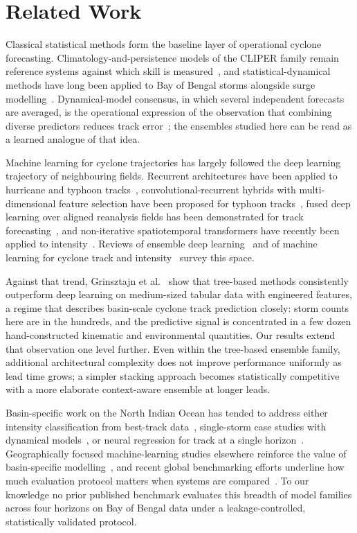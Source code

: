 \documentclass[10pt,twocolumn,a4paper]{article}
\newcommand{\bob}{Bay of Bengal}
\begin{document}
\section{Related Work}
\label{sec:related}
Classical statistical methods form the baseline layer of operational cyclone
forecasting. Climatology-and-persistence models of the CLIPER family remain
reference systems against which skill is
measured~\cite{neumann1972alternative,aberson1998five}, and statistical-dynamical
methods have long been applied to \bob{} storms alongside surge
modelling~\cite{dube2009storm}. Dynamical-model consensus, in which several
independent forecasts are averaged, is the operational expression of the
observation that combining diverse predictors reduces track
error~\cite{goerss2000tropical,goerss2004tropical}; the ensembles studied here
can be read as a learned analogue of that idea.

Machine learning for cyclone trajectories has largely followed the deep learning
trajectory of neighbouring fields. Recurrent architectures have been applied to
hurricane and typhoon tracks~\cite{alemany2019predicting,rahman2025tropical},
convolutional-recurrent hybrids with multi-dimensional feature selection have
been proposed for typhoon tracks~\cite{lian2020novel}, fused deep learning over
aligned reanalysis fields has been demonstrated for track
forecasting~\cite{giffard2020tropical}, and non-iterative spatiotemporal
transformers have recently been applied to intensity~\cite{qu2025accurate}.
Reviews of ensemble deep learning~\cite{ganaie2022ensemble} and of machine
learning for cyclone track and intensity~\cite{kumar2024machine} survey this
space.

Against that trend, Grinsztajn et al.~\cite{grinsztajn2022tree} show that
tree-based methods consistently outperform deep learning on medium-sized tabular
data with engineered features, a regime that describes basin-scale cyclone track
prediction closely: storm counts here are in the hundreds, and the predictive
signal is concentrated in a few dozen hand-constructed kinematic and
environmental quantities. Our results extend that observation one level further.
Even within the tree-based ensemble family, additional architectural complexity
does not improve performance uniformly as lead time grows; a simpler stacking
approach becomes statistically competitive with a more elaborate context-aware
ensemble at longer leads.

Basin-specific work on the North Indian Ocean has tended to address either
intensity classification from best-track
data~\cite{kar2021tropical}, single-storm case studies with dynamical
models~\cite{hossain2021track}, or neural regression for track at a single
horizon~\cite{krishnamurti2010ann}. Geographically focused machine-learning
studies elsewhere reinforce the value of basin-specific
modelling~\cite{pan2024guangdong}, and recent global benchmarking efforts
underline how much evaluation protocol matters when systems are
compared~\cite{gomez2026tcbench}. To our knowledge no prior published benchmark
evaluates this breadth of model families across four horizons on \bob{} data
under a leakage-controlled, statistically validated protocol.
\end{document}
